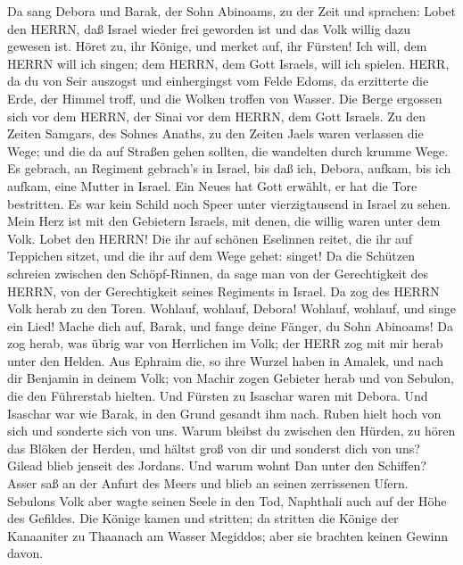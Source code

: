  Da sang Debora und Barak, der Sohn Abinoams, zu der Zeit
und sprachen:  Lobet den HERRN, daß Israel wieder frei
geworden ist und das Volk willig dazu gewesen ist.  Höret
zu, ihr Könige, und merket auf, ihr Fürsten! Ich will, dem HERRN will
ich singen; dem HERRN, dem Gott Israels, will ich spielen. 
HERR, da du von Seir auszogst und einhergingst vom Felde Edoms, da
erzitterte die Erde, der Himmel troff, und die Wolken troffen von
Wasser.  Die Berge ergossen sich vor dem HERRN, der Sinai
vor dem HERRN, dem Gott Israels.  Zu den Zeiten Samgars, des
Sohnes Anaths, zu den Zeiten Jaels waren verlassen die Wege; und die da
auf Straßen gehen sollten, die wandelten durch krumme Wege. 
Es gebrach, an Regiment gebrach's in Israel, bis daß ich, Debora,
aufkam, bis ich aufkam, eine Mutter in Israel.  Ein Neues
hat Gott erwählt, er hat die Tore bestritten. Es war kein Schild noch
Speer unter vierzigtausend in Israel zu sehen.  Mein Herz
ist mit den Gebietern Israels, mit denen, die willig waren unter dem
Volk. Lobet den HERRN!  Die ihr auf schönen Eselinnen
reitet, die ihr auf Teppichen sitzet, und die ihr auf dem Wege gehet:
singet!  Da die Schützen schreien zwischen den
Schöpf-Rinnen, da sage man von der Gerechtigkeit des HERRN, von der
Gerechtigkeit seines Regiments in Israel. Da zog des HERRN Volk herab zu
den Toren.  Wohlauf, wohlauf, Debora! Wohlauf, wohlauf, und
singe ein Lied! Mache dich auf, Barak, und fange deine Fänger, du Sohn
Abinoams!  Da zog herab, was übrig war von Herrlichen im
Volk; der HERR zog mit mir herab unter den Helden.  Aus
Ephraim die, so ihre Wurzel haben in Amalek, und nach dir Benjamin in
deinem Volk; von Machir zogen Gebieter herab und von Sebulon, die den
Führerstab hielten.  Und Fürsten zu Isaschar waren mit
Debora. Und Isaschar war wie Barak, in den Grund gesandt ihm nach. Ruben
hielt hoch von sich und sonderte sich von uns.  Warum
bleibst du zwischen den Hürden, zu hören das Blöken der Herden, und
hältst groß von dir und sonderst dich von uns?  Gilead
blieb jenseit des Jordans. Und warum wohnt Dan unter den Schiffen? Asser
saß an der Anfurt des Meers und blieb an seinen zerrissenen Ufern.
 Sebulons Volk aber wagte seinen Seele in den Tod,
Naphthali auch auf der Höhe des Gefildes.  Die Könige kamen
und stritten; da stritten die Könige der Kanaaniter zu Thaanach am
Wasser Megiddos; aber sie brachten keinen Gewinn davon. 
